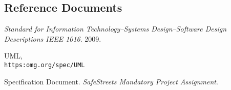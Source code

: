 \subsection{Reference Documents}
\begin{thebibliography}{9}
\textit{Standard for Information Technology--Systems Design--Software Design Descriptions IEEE 1016}. 
2009.

UML,
\\\texttt{https:omg.org/spec/UML}

Specification Document. 
\textit{SafeStreets Mandatory Project Assignment}. 

\end{thebibliography}